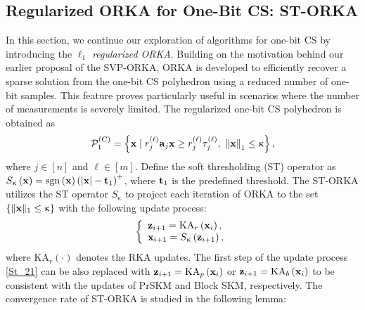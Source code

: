 \documentclass[12pt,draftcls,onecolumn]{IEEEtran}
\begin{document}
\subsection{ Regularized ORKA for One-Bit CS: ST-ORKA}
\label{ocs_constrained}
In this section, we continue our exploration of algorithms for one-bit CS by introducing the \emph{$\ell_1$ regularized ORKA}. Building on the motivation behind our earlier proposal of the SVP-ORKA, ORKA is developed to efficiently recover
a sparse solution from the one-bit CS polyhedron using a reduced number of one-bit samples. This feature proves particularly useful in scenarios where the number of measurements is severely limited. The regularized one-bit CS polyhedron is obtained as
\begin{equation}
\label{Stefanie_50}
\mathcal{P}^{(C)}_1=\left\{\mbx\mid r^{(\ell)}_{j}\mba_j\mbx\geq r^{(\ell)}_{j}\tau^{(\ell)}_{j},~ \left\|\mbx\right\|_1\leq \upkappa\right\},
\end{equation}
where $j\in[n]$ and $\ell\in[m]$.
Define the soft thresholding (ST) operator as $S_{\upkappa}\left(\mathbf{x}\right)= \operatorname{sgn}\left(\mathbf{x}\right)\left(|\mathbf{x}|-\mathbf{t}_1\right)^{+}$, where $\mathbf{t}_1$ is the predefined threshold. The ST-ORKA utilizes the %
ST operator $S_{\upkappa}$ 
to project each iteration of ORKA to the set $\left\{\|\mathbf{x}\|_1\leq\upkappa\right\}$
with the following update process:
\begin{equation}
\label{St_21}
\left\{\begin{array}{l}
\mbz_{i+1}=\mathrm{KA}_r\left(\mbx_i\right),\\
\mbx_{i+1} = S_{\upkappa}\left(\mbz_{i+1}\right),
\end{array}\right.
\end{equation}
where $\mathrm{KA}_r(\cdot)$ denotes the RKA updates. The first step of the update process \eqref{St_21} can be also replaced with $\mathbf{z}_{i+1}=\mathrm{KA}_p\left(\mathbf{x}_i\right)$ or $\mathbf{z}_{i+1}=\mathrm{KA}_b\left(\mathbf{x}_i\right)$ to be consistent with the updates of PrSKM and Block SKM, respectively. The convergence rate of ST-ORKA is studied in the following lemma:
\end{document}
